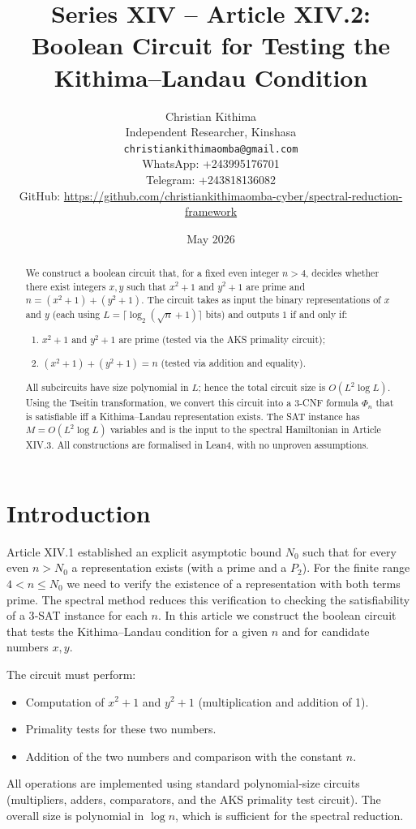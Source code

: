 \documentclass[11pt,a4paper]{article}
\title{Series XIV – Article XIV.2: Boolean Circuit for Testing the Kithima–Landau Condition}
\author{Christian Kithima \\
Independent Researcher, Kinshasa \\
\texttt{christiankithimaomba@gmail.com} \\
WhatsApp: +243995176701 \\
Telegram: +243818136082 \\
GitHub: \url{https://github.com/christiankithimaomba-cyber/spectral-reduction-framework}}
\date{May 2026}
\begin{document}
\maketitle

\begin{abstract}
We construct a boolean circuit that, for a fixed even integer \(n>4\), decides whether there exist integers \(x,y\) such that \(x^{2}+1\) and \(y^{2}+1\) are prime and \(n = (x^{2}+1)+(y^{2}+1)\). The circuit takes as input the binary representations of \(x\) and \(y\) (each using \(L = \lceil \log_{2}(\sqrt{n}+1)\rceil\) bits) and outputs \(1\) if and only if:
\begin{enumerate}
\item \(x^{2}+1\) and \(y^{2}+1\) are prime (tested via the AKS primality circuit);
\item \((x^{2}+1)+(y^{2}+1) = n\) (tested via addition and equality).
\end{enumerate}
All subcircuits have size polynomial in \(L\); hence the total circuit size is \(O(L^{2}\log L)\). Using the Tseitin transformation, we convert this circuit into a 3‑CNF formula \(\Phi_{n}\) that is satisfiable iff a Kithima–Landau representation exists. The SAT instance has \(M = O(L^{2}\log L)\) variables and is the input to the spectral Hamiltonian in Article XIV.3. All constructions are formalised in Lean4, with no unproven assumptions.
\end{abstract}

\tableofcontents

\section{Introduction}

Article XIV.1 established an explicit asymptotic bound \(N_{0}\) such that for every even \(n > N_{0}\) a representation exists (with a prime and a \(P_{2}\)). For the finite range \(4 < n \le N_{0}\) we need to verify the existence of a representation with both terms prime. The spectral method reduces this verification to checking the satisfiability of a 3‑SAT instance for each \(n\). In this article we construct the boolean circuit that tests the Kithima–Landau condition for a given \(n\) and for candidate numbers \(x,y\).

The circuit must perform:
\begin{itemize}
\item Computation of \(x^{2}+1\) and \(y^{2}+1\) (multiplication and addition of 1).
\item Primality tests for these two numbers.
\item Addition of the two numbers and comparison with the constant \(n\).
\end{itemize}
All operations are implemented using standard polynomial‑size circuits (multipliers, adders, comparators, and the AKS primality test circuit). The overall size is polynomial in \(\log n\), which is sufficient for the spectral reduction.
\end{document}
